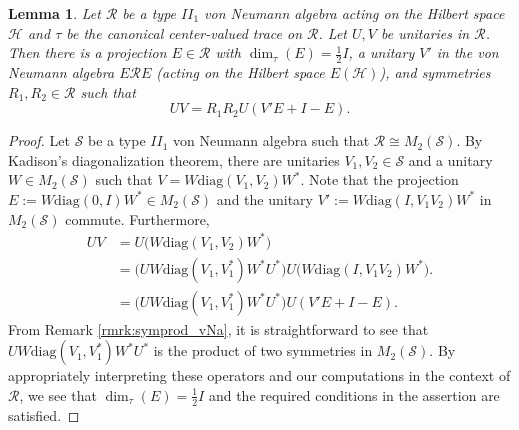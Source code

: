 \documentclass[12pt, preprint]{amsart}
\newtheorem{lem}[thm]{Lemma}
\theoremstyle{definition}
\theoremstyle{remark}
\numberwithin{equation}{section}
\theoremstyle{ser}
\theoremstyle{serr}
\theoremstyle{ser}
\begin{document}
\begin{lem}
\label{lem:two_uni_prod_sym}
\textsl{
Let $\mathscr{R}$ be a type $II_1$ von Neumann algebra acting on the Hilbert space $\mathscr{H}$ and $\tau$ be the canonical center-valued trace on $\mathscr{R}$. Let $U, V$ be unitaries in $\mathscr{R}$. Then there is a projection $E \in \mathscr{R}$ with $\dim _{\tau} (E) = \frac{1}{2} I$, a unitary $V'$ in the von Neumann algebra $E\mathscr{R}E$ (acting on the Hilbert space $E(\mathscr{H})$), and symmetries $R_1, R_2 \in \mathscr{R}$ such that $$UV = R_1 R_2 U (V' E + I-E).$$
}
\end{lem}
\begin{proof}
Let $\mathscr{S}$ be a type $II_1$ von Neumann algebra such that $\mathscr{R} \cong M_2(\mathscr{S})$. By Kadison's diagonalization theorem, there are unitaries $V_1, V_2 \in \mathscr{S}$ and a unitary $W \in M_2(\mathscr{S})$ such that $V= W \mathrm{diag}(V_1, V_2) W^*$. Note that the projection $E := W \mathrm{diag}(0, I) W^* \in M_2(\mathscr{S})$ and the unitary $V' := W \mathrm{diag}(I, V_1 V_2) W^*$ in $M_2(\mathscr{S})$ commute. Furthermore, 
\begin{align*}
UV &= U \big( W \mathrm{diag}(V_1, V_2) W^* \big)\\
&= \big( U W \mathrm{diag}(V_1, V_1 ^*) W^* U^* \big) U \big( W \mathrm{diag}(I, V_1 V_2) W^* \big).\\
&= \big( U W \mathrm{diag}(V_1, V_1 ^*) W^* U^* \big) U (V'E + I-E).
\end{align*}
From Remark \ref{rmrk:symprod_vNa}, it is straightforward to see that $U W \mathrm{diag}(V_1, V_1 ^*) W^* U^*$ is the product of two symmetries in $M_2(\mathscr{S})$.  By appropriately interpreting these operators and our computations in the context of $\mathscr{R}$, we see that $\dim _{\tau} (E) = \frac{1}{2}I$ and the required conditions in the assertion are satisfied.
\end{proof}
\end{document}
